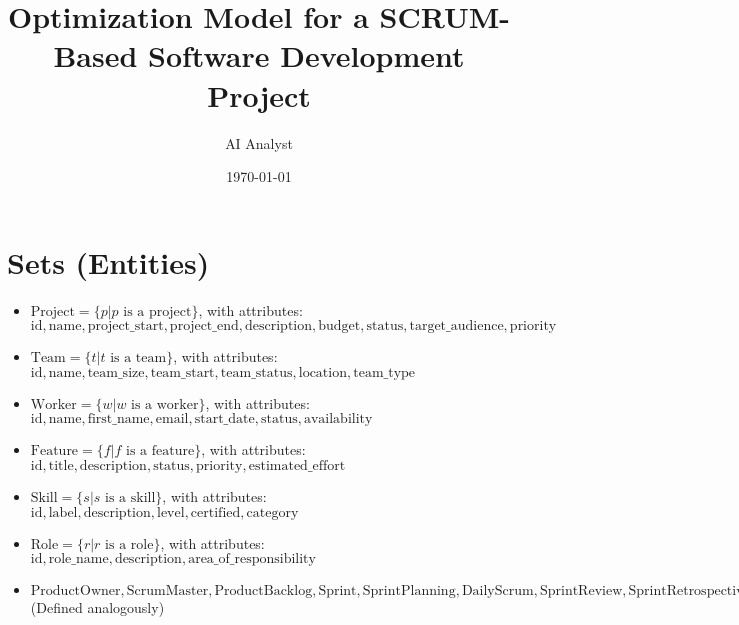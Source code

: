 \documentclass[11pt]{article}
\title{Optimization Model for a SCRUM-Based Software Development Project}
\author{AI Analyst}
\date{\today}
\begin{document}
\maketitle
\tableofcontents
\newpage

\section{Sets (Entities)}
\begin{itemize}
    \item $\text{Project} = \{p | p \text{ is a project}\}$, with attributes: $\text{id}, \text{name}, \text{project\_start}, \text{project\_end}, \text{description}, \text{budget}, \text{status}, \text{target\_audience}, \text{priority}$
    \item $\text{Team} = \{t | t \text{ is a team}\}$, with attributes: $\text{id}, \text{name}, \text{team\_size}, \text{team\_start}, \text{team\_status}, \text{location}, \text{team\_type}$
    \item $\text{Worker} = \{w | w \text{ is a worker}\}$, with attributes: $\text{id}, \text{name}, \text{first\_name}, \text{email}, \text{start\_date}, \text{status}, \text{availability}$
    \item $\text{Feature} = \{f | f \text{ is a feature}\}$, with attributes: $\text{id}, \text{title}, \text{description}, \text{status}, \text{priority}, \text{estimated\_effort}$
    \item $\text{Skill} = \{s | s \text{ is a skill}\}$, with attributes: $\text{id}, \text{label}, \text{description}, \text{level}, \text{certified}, \text{category}$
    \item $\text{Role} = \{r | r \text{ is a role}\}$, with attributes: $\text{id}, \text{role\_name}, \text{description}, \text{area\_of\_responsibility}$
    \item $\text{ProductOwner}, \text{ScrumMaster}, \text{ProductBacklog}, \text{Sprint}, \text{SprintPlanning}, \text{DailyScrum}, \text{SprintReview}, \text{SprintRetrospective}, \text{SprintBacklog}, \text{SprintGoal}, \text{Epic}, \text{UserStory}, \text{Task}, \text{DevelopmentSnapshot}, \text{Blocker}, \text{Stakeholder}, \text{Velocity}, \text{ReleasePlan}, \text{Roadmap}, \text{ScrumBoard}, \text{FeatureDocumentation}$ (Defined analogously)
\end{itemize}
\end{document}
